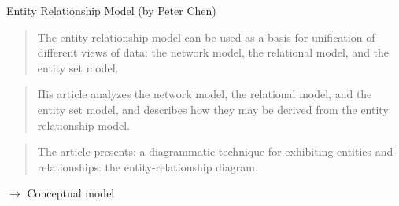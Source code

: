 \begin{frame}{Entity Relationship Model (by Peter Chen)}
\begin{block}{\cite[9]{chen1976}}
    \begin{quote}
        The entity-relationship model can be used as a basis for unification of different views of data: the network model, the relational model, and the entity set model.~
    \end{quote}
\end{block}
\begin{block}{\cite[10]{chen1976}}
    \begin{quote}
        \lbrack{}His article\rbrack{} analyzes the network model, the relational model, and the entity set model, and describes how they may be derived from the entity relationship model.~
    \end{quote}
\end{block}
\begin{block}{\cite[19]{chen1976}}
    \begin{quote}
        \lbrack{}The article presents:\rbrack{} a diagrammatic technique for exhibiting entities and relationships: the entity-relationship diagram.~%
    \end{quote}
\end{block}
$\to$ \alert{Conceptual model}

\end{frame}

